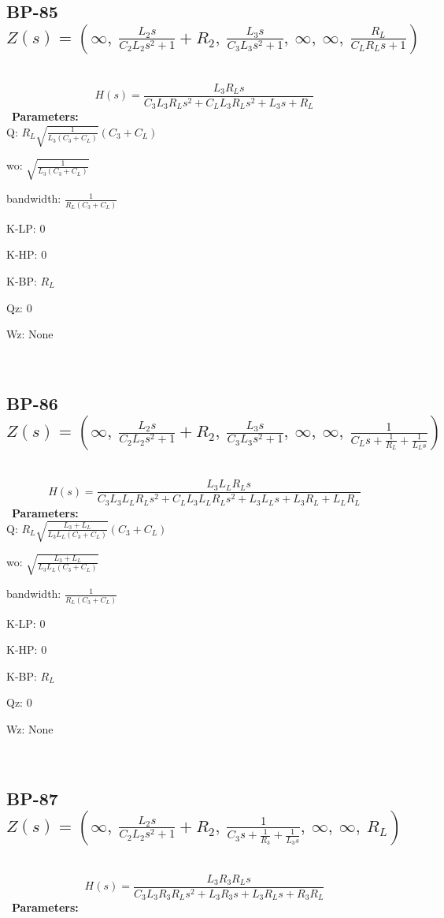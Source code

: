 \documentclass{article}
\begin{document}
\subsection{BP-85 $Z(s) = \left( \infty, \  \frac{L_{2} s}{C_{2} L_{2} s^{2} + 1} + R_{2}, \  \frac{L_{3} s}{C_{3} L_{3} s^{2} + 1}, \  \infty, \  \infty, \  \frac{R_{L}}{C_{L} R_{L} s + 1}\right)$ } \ 
\textbf{\[H(s) = \frac{L_{3} R_{L} s}{C_{3} L_{3} R_{L} s^{2} + C_{L} L_{3} R_{L} s^{2} + L_{3} s + R_{L}}\] } \ 
\textbf{Parameters:}\\ 

Q: $R_{L} \sqrt{\frac{1}{L_{3} \left(C_{3} + C_{L}\right)}} \left(C_{3} + C_{L}\right)$\ 

wo: $\sqrt{\frac{1}{L_{3} \left(C_{3} + C_{L}\right)}}$\ 

bandwidth: $\frac{1}{R_{L} \left(C_{3} + C_{L}\right)}$\ 

K-LP: $0$\ 

K-HP: $0$\ 

K-BP: $R_{L}$\ 

Qz: $0$\ 

Wz: $\text{None}$\ 

\ 

\subsection{BP-86 $Z(s) = \left( \infty, \  \frac{L_{2} s}{C_{2} L_{2} s^{2} + 1} + R_{2}, \  \frac{L_{3} s}{C_{3} L_{3} s^{2} + 1}, \  \infty, \  \infty, \  \frac{1}{C_{L} s + \frac{1}{R_{L}} + \frac{1}{L_{L} s}}\right)$ } \ 
\textbf{\[H(s) = \frac{L_{3} L_{L} R_{L} s}{C_{3} L_{3} L_{L} R_{L} s^{2} + C_{L} L_{3} L_{L} R_{L} s^{2} + L_{3} L_{L} s + L_{3} R_{L} + L_{L} R_{L}}\] } \ 
\textbf{Parameters:}\\ 

Q: $R_{L} \sqrt{\frac{L_{3} + L_{L}}{L_{3} L_{L} \left(C_{3} + C_{L}\right)}} \left(C_{3} + C_{L}\right)$\ 

wo: $\sqrt{\frac{L_{3} + L_{L}}{L_{3} L_{L} \left(C_{3} + C_{L}\right)}}$\ 

bandwidth: $\frac{1}{R_{L} \left(C_{3} + C_{L}\right)}$\ 

K-LP: $0$\ 

K-HP: $0$\ 

K-BP: $R_{L}$\ 

Qz: $0$\ 

Wz: $\text{None}$\ 

\ 

\subsection{BP-87 $Z(s) = \left( \infty, \  \frac{L_{2} s}{C_{2} L_{2} s^{2} + 1} + R_{2}, \  \frac{1}{C_{3} s + \frac{1}{R_{3}} + \frac{1}{L_{3} s}}, \  \infty, \  \infty, \  R_{L}\right)$ } \ 
\textbf{\[H(s) = \frac{L_{3} R_{3} R_{L} s}{C_{3} L_{3} R_{3} R_{L} s^{2} + L_{3} R_{3} s + L_{3} R_{L} s + R_{3} R_{L}}\] } \ 
\textbf{Parameters:}\\ 
\end{document}
